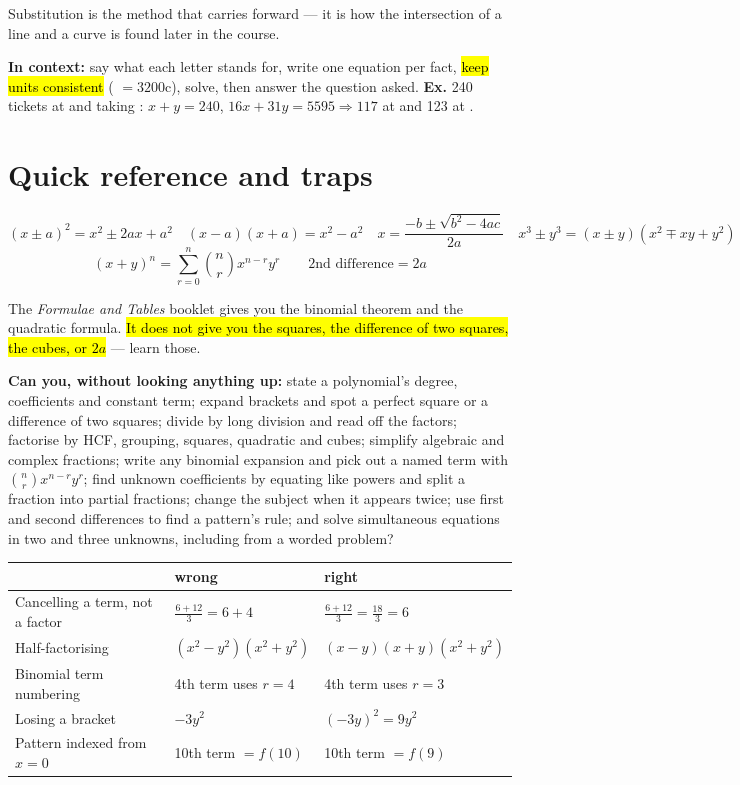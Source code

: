 \documentclass[11pt]{article}
\newcommand{\key}[1]{\hl{#1}}
\newcommand{\wex}[1]{{\color{lilacdeep}\textbf{Ex.}} #1}
\begin{document}
Substitution is the method that carries forward --- it is how the intersection of a line and a curve is found later in the course.

\textbf{In context:} say what each letter stands for, write one equation per fact, \key{keep units consistent} ( $=3200$c), solve, then answer the question asked. \wex{240 tickets at  and  taking \texteuro 5595: $x+y=240$, $16x+31y=5595\Rightarrow117$ at \texteuro 31 and 123 at \texteuro 16.}

\section*{\color{lilacdeep}Quick reference and traps}

\begin{formulabox}
\[(x\pm a)^{2}=x^{2}\pm2ax+a^{2}\quad (x-a)(x+a)=x^{2}-a^{2}\quad x=\frac{-b\pm\sqrt{b^{2}-4ac}}{2a}\quad
x^{3}\pm y^{3}=(x\pm y)(x^{2}\mp xy+y^{2})\]
\[(x+y)^{n}=\sum_{r=0}^{n}\binom nrx^{n-r}y^{r}\qquad\text{2nd difference}=2a\]
\end{formulabox}

The \textit{Formulae and Tables} booklet gives you the binomial theorem and the quadratic formula. \key{It does not give you the squares, the difference of two squares, the cubes, or \mbox{$2a$}} --- learn those.

\textbf{Can you, without looking anything up:} state a polynomial's degree, coefficients and constant term; expand brackets and spot a perfect square or a difference of two squares; divide by long division and read off the factors; factorise by HCF, grouping, squares, quadratic and cubes; simplify algebraic and complex fractions; write any binomial expansion and pick out a named term with $\binom nrx^{n-r}y^{r}$; find unknown coefficients by equating like powers and split a fraction into partial fractions; change the subject when it appears twice; use first and second differences to find a pattern's rule; and solve simultaneous equations in two and three unknowns, including from a worded problem?

\begin{center}
\begin{tabular}{@{}p{6.0cm}p{4.3cm}p{4.3cm}@{}}
\toprule
& \textbf{\color{lilacdeep}wrong} & \textbf{\color{lilacdeep}right}\\
\midrule
Cancelling a term, not a factor & $\frac{6+12}{3}=6+4$ & $\frac{6+12}{3}=\frac{18}{3}=6$\\
Half-factorising & $(x^{2}-y^{2})(x^{2}+y^{2})$ & $(x-y)(x+y)(x^{2}+y^{2})$\\
Binomial term numbering & 4th term uses $r=4$ & 4th term uses $r=3$\\
Losing a bracket & $-3y^{2}$ & $(-3y)^{2}=9y^{2}$\\
Pattern indexed from $x=0$ & 10th term $=f(10)$ & 10th term $=f(9)$\\
\bottomrule
\end{tabular}
\end{center}
\end{document}
